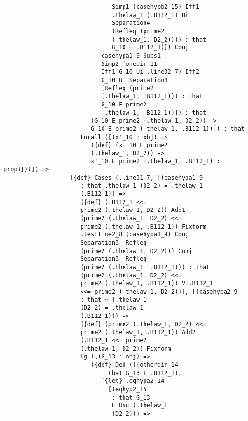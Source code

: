 \documentclass[12pt]{article}
\begin{document}
\begin{verbatim}
                               Simp1 (casehypb2_15) Iff1 
                               .thelaw_1 (.B112_1) Ui 
                               Separation4 
                               (Refleq (prime2 
                               (.thelaw_1, D2_2)))) : that 
                               G_10 E .B112_1)]) Conj 
                            casehypa1_9 Subs1 
                            Simp2 (onedir_11 
                            Iff1 G_10 Ui .line32_7) Iff2 
                            G_10 Ui Separation4 
                            (Refleq (prime2 
                            (.thelaw_1, .B112_1))) : that 
                            G_10 E prime2 
                            (.thelaw_1, .B112_1))]) : that 
                         (G_10 E prime2 (.thelaw_1, D2_2)) -> 
                         G_10 E prime2 (.thelaw_1, .B112_1))]) : that 
                      Forall ([(x'_10 : obj) => 
                         ({def} (x'_10 E prime2 
                         (.thelaw_1, D2_2)) -> 
                         x'_10 E prime2 (.thelaw_1, .B112_1) : prop)]))]) => 
                   ({def} Cases (.line31_7, [(casehypa1_9 
                      : that .thelaw_1 (D2_2) = .thelaw_1 
                      (.B112_1)) => 
                      ({def} (.B112_1 <<= 
                      prime2 (.thelaw_1, D2_2)) Add1 
                      (prime2 (.thelaw_1, D2_2) <<= 
                      prime2 (.thelaw_1, .B112_1)) Fixform 
                      .testline2_8 (casehypa1_9) Conj 
                      Separation3 (Refleq 
                      (prime2 (.thelaw_1, D2_2))) Conj 
                      Separation3 (Refleq 
                      (prime2 (.thelaw_1, .B112_1))) : that 
                      (prime2 (.thelaw_1, D2_2) <<= 
                      prime2 (.thelaw_1, .B112_1)) V .B112_1 
                      <<= prime2 (.thelaw_1, D2_2))], [(casehypa2_9 
                      : that ~ (.thelaw_1 
                      (D2_2) = .thelaw_1 
                      (.B112_1))) => 
                      ({def} (prime2 (.thelaw_1, D2_2) <<= 
                      prime2 (.thelaw_1, .B112_1)) Add2 
                      (.B112_1 <<= prime2 
                      (.thelaw_1, D2_2)) Fixform 
                      Ug ([(G_13 : obj) => 
                         ({def} Ded ([(otherdir_14 
                            : that G_13 E .B112_1), 
                            ({let} .eqhypa2_14 
                            : [(eqhyp2_15 
                               : that G_13 
                               E Usc (.thelaw_1 
                               (D2_2))) => 

\end{verbatim}
\end{document}
